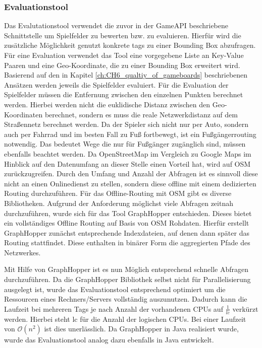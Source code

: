 \subsubsection*{Evaluationstool}

Das Evalutationstool verwendet die zuvor in der GameAPI beschriebene Schnittstelle um Spielfelder zu bewerten bzw. zu evaluieren. Hierfür wird die zusätzliche Möglichkeit genutzt konkrete tags zu einer Bounding Box abzufragen. Für eine Evaluation verwendet das Tool eine vorgegebene Liste an Key-Value Paaren und eine Geo-Koordinate, die zu einer Bounding Box erweitert wird. Basierend auf den in Kapitel \ref{ch:CH6_qualtiy_of_gameboards} beschriebenen Ansätzen werden jeweils die Spielfelder evaluiert. Für die Evaluation der Spielfelder müssen die Entfernung zwischen den einzelnen Punkten berechnet werden. Hierbei werden nicht die euklidische Distanz zwischen den Geo-Koordinaten berechnet, sondern es muss die reale Netzwerkdistanz auf dem Straßennetz berechnet werden. Da der Spieler sich nicht nur per Auto, sondern auch per Fahrrad und im besten Fall zu Fuß fortbewegt, ist ein Fußgängerrouting notwendig. Das bedeutet Wege die nur für Fußgänger zugänglich sind, müssen ebenfalls beachtet werden. Da OpenStreetMap im Vergleich zu Google Maps im Hinblick auf den Datenumfang an dieser Stelle einen Vorteil hat, wird auf OSM zurückzugreifen. Durch den Umfang und Anzahl der Abfragen ist es sinnvoll diese nicht an einen Onlinedienst zu stellen, sondern diese offline mit einem dedizierten Routing durchzuführen. Für das Offline-Routing mit OSM gibt es diverse Bibliotheken. Aufgrund der Anforderung möglichst viele Abfragen zeitnah durchzuführen, wurde sich für das Tool GraphHopper entschieden. Dieses bietet ein vollständiges Offline Routing auf Basis von OSM Rohdaten.\cite{Karich.2014} Hierfür erstellt GraphHopper zunächst entsprechende Indexdateien, auf denen dann später das Routing stattfindet. Diese enthalten in binärer Form die aggregierten Pfade des Netzwerkes.

Mit Hilfe von GraphHopper ist es nun Möglich entsprechend schnelle Abfragen durchzuführen. Da die GraphHopper Bibliothek selbst nicht für Parallelisierung ausgelegt ist, wurde das Evaluationstool entsprechend optimiert um die Ressourcen eines Rechners/Servers vollständig auszunutzen. Dadurch kann die Laufzeit bei mehreren Tags je nach Anzahl der vorhandenen CPUs auf $\frac{1}{lc}$ verkürzt werden. Hierbei steht lc für die Anzahl der logischen CPUs. Bei einer Laufzeit von $\mathcal O(n^2)$ ist dies unerlässlich.
Da GraphHopper in Java realisiert wurde, wurde das Evaluationstool analog dazu ebenfalls in Java entwickelt.


